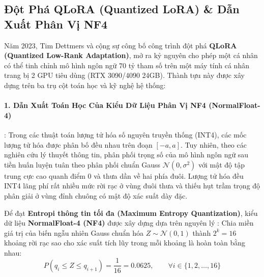 \subsection{Đột Phá QLoRA (Quantized LoRA) \& Dẫn Xuất Phân Vị NF4}
\label{sec:qlora-nf4-math}

Năm 2023, Tim Dettmers và cộng sự công bố công trình đột phá \textbf{QLoRA (Quantized Low-Rank Adaptation)}, mở ra kỷ nguyên cho phép một cá nhân có thể tinh chỉnh mô hình ngôn ngữ 70 tỷ tham số trên một máy tính cá nhân trang bị 2 GPU tiêu dùng (RTX 3090/4090 24GB). Thành tựu này được xây dựng trên ba trụ cột toán học và kỹ nghệ hệ thống:

\paragraph{1. Dẫn Xuất Toán Học Của Kiểu Dữ Liệu Phân Vị NF4 (NormalFloat-4)}:
Trong các thuật toán lượng tử hóa số nguyên truyền thống (INT4), các mốc lượng tử hóa được phân bố đều nhau trên đoạn $[-a, a]$. Tuy nhiên, theo các nghiên cứu lý thuyết thông tin, phân phối trọng số của mô hình ngôn ngữ sau tiền huấn luyện tuân theo phân phối chuẩn Gauss $\mathcal{N}(0, \sigma^2)$ với mật độ tập trung cực cao quanh điểm 0 và thưa dần về hai phía đuôi. Lượng tử hóa đều INT4 lãng phí rất nhiều mức rời rạc ở vùng đuôi thưa và thiếu hụt trầm trọng độ phân giải ở vùng đỉnh chuông có mật độ xác suất dày đặc.

Để đạt \textbf{Entropi thông tin tối đa (Maximum Entropy Quantization)}, kiểu dữ liệu \textbf{NormalFloat-4 (NF4)} được xây dựng dựa trên nguyên lý : Chia miền giá trị của biến ngẫu nhiên Gauss chuẩn hóa $Z \sim \mathcal{N}(0, 1)$ thành $2^k = 16$ khoảng rời rạc sao cho xác suất tích lũy trong mỗi khoảng là hoàn toàn bằng nhau:
\begin{equation}
P(q_i \le Z \le q_{i+1}) = \frac{1}{16} = 0.0625, \qquad \forall i \in \{1, 2, \dots, 16\}
\end{equation}

